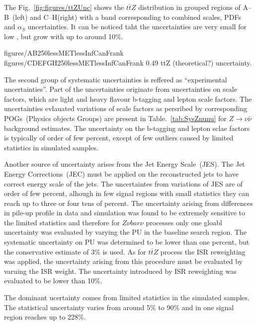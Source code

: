 The Fig.~\ref{fig:figures/ttZUnc} shows the $t\bar{t}Z$ \MET distribution in grouped regions of A--B~(left) and C--H(right) with a band corresponding to combined scales, PDFs and $\alpha_{S}$ uncertainties. It can be noticed taht the uncertainties are very small for low \MET, but grow with \MET up to around 10\%.

                 {figures/AB250lessMETlessInfCanFrank} %
                 {figures/CDEFGH250lessMETlessInfCanFrank} %
                 {0.49}       %
                 { ttZ (theoretical?) uncertainty. }


The second group of systematic uncertainties is reffered as ``experimental uncertainties''. Part of the uncertainties originate from uncertainties on scale factors, which are light and heavy flavour b-tagging and lepton scale factors. The uncertainties evlauated variations of scale factors as persribed by corresponding POGs~(Physics objects Groups) are present in Table.~\ref{tab:SysZnunu} for $Z \to \nu \bar{\nu}$ background estimates. The uncertainty on the b-tagging and lepton sclae factors is typically of order of few percent, except of few outliers caused by limited statistics in simulated samples.

Another source of uncertainty arises from the Jet Energy Scale~(JES). The Jet Energy Corrections~(JEC) must be applied on the reconstructed jets to have correct energy scale of the jets. The uncertaintes from variations of JES are of order of few percent, alhough in few signal regions with small statistics they can reach up to three or four tens of percent. The uncertainty arising from differences in pile-up profile in data and simulation was found to be extremely sensitive to the limited statistics and therefore for $Z \nu bar{\nu}$ processes only one gloabl uncertainty was evaluated by varying the PU in the baseline search region. The systematic uncertainty on PU was determined to be lower than one percent, but the conservative estimate of 3\% is used. As for $t\bar{t}Z$ process the ISR reweighting was applied, the uncertainty arising from this procedure must be evaluated by varuing the ISR weight. The uncertainty introduced by ISR reweighting was evaluated to be lower than 10\%.

The dominant ucertainty comes from limited statistics in the simulated samples. The statistical uncertainty varies from around 5\% to 90\% and in one signal region reaches up to 228\%.

